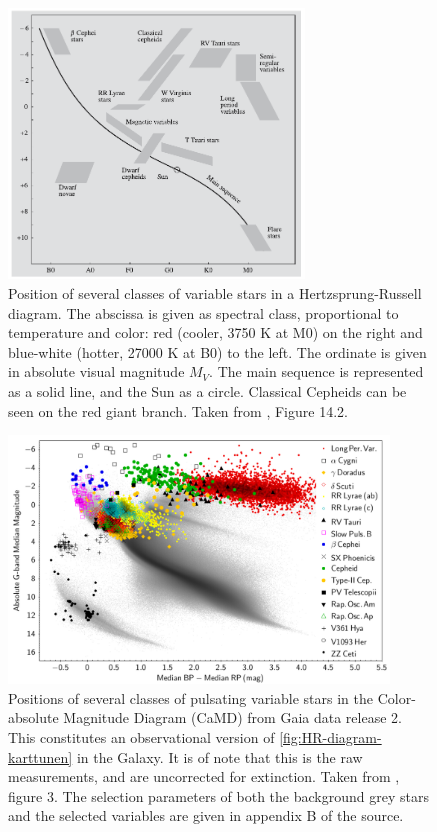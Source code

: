 	
	\begin{figure}
		\centering
		\includegraphics[width=0.7\textwidth]{img/Karttunen_13.2.pdf}
		\caption[Variable stars in the HR diagram]{
			Position of several classes of variable stars in a Hertzsprung-Russell diagram.
			The abscissa is given as spectral class, proportional to temperature and color: 
			red (cooler, 3750 K at M0) on the right and blue-white (hotter, 27000 K at B0) to the left. 
			The ordinate is given in absolute visual magnitude $M_V$.
			The main sequence is represented as a solid line, and the Sun as a circle.
			Classical Cepheids can be seen on the red giant branch. 
			Taken from \cite{Karttunen2017}, Figure 14.2.
		}
		\label{fig:HR-diagram-karttunen}
	\end{figure}
	
	\begin{figure}
		\centering
		\includegraphics[width=0.9\textwidth]{img/GaiaCaMD.png}
		\caption[Pulsating stars on the CaMD from Gaia data release 2]{
			Positions of several classes of pulsating variable stars in the Color-absolute Magnitude Diagram (CaMD) from Gaia data release 2.
			This constitutes an observational version of \autoref{fig:HR-diagram-karttunen} in the Galaxy.
			It is of note that this is the raw measurements, and are uncorrected for extinction.
			Taken from \cite{Gaia2019}, figure 3. 
			The selection parameters of both the background grey stars and the selected variables are given in appendix B of the source.
		}
		\label{fig:Gaia-CaMD}
	\end{figure}
	
